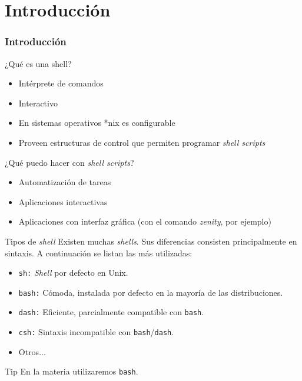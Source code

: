\section{Introducción}
\begin{frame}
  \frametitle{Introducción}
  ¿Qué es una shell?
  \begin{itemize}
  \item Intérprete de \alert{comandos}
  \item Interactivo
  \item En sistemas operativos *nix es configurable
  \item Proveen estructuras de control que permiten programar \textit{shell scripts}
  \end{itemize}

  \pause
  ¿Qué puedo hacer con \textit{shell scripts}?
  \begin{itemize}
  \item \alert{Automatización} de tareas
  \item Aplicaciones interactivas
  \item Aplicaciones con interfaz gráfica (con el comando \textit{zenity},
    por ejemplo)
  \end{itemize}
\end{frame}

\begin{frame}{Tipos de \textit{shell}}
  Existen muchas \textit{shells}. Sus diferencias consisten principalmente
  en sintaxis. A continuación se listan las más utilizadas:
  \begin{itemize}
  \item \texttt{sh:} \textit{Shell} por defecto en Unix.
  \item \texttt{bash:} Cómoda, instalada por defecto en la mayoría de las
    distribuciones.
  \item \texttt{dash:} Eficiente, parcialmente compatible con
    \texttt{bash}.
  \item \texttt{csh:} Sintaxis incompatible con
    \texttt{bash}/\texttt{dash}.
  \item Otros...
  \end{itemize}
  \pause
  \begin{block}{Tip}
	En la materia utilizaremos \texttt{bash}.
  \end{block}
\end{frame}

